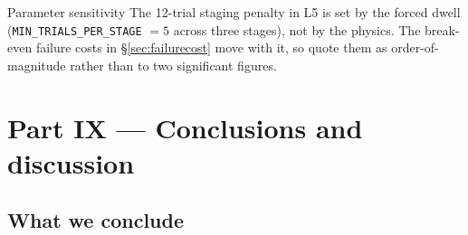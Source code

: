 \documentclass[11pt,a4paper]{article}
\begin{document}
\begin{warnbox}{Parameter sensitivity}
The 12-trial staging penalty in L5 is set by the forced dwell
(\texttt{MIN\_TRIALS\_PER\_STAGE} $=5$ across three stages), not by the
physics. The break-even failure costs in \S\ref{sec:failurecost} move with
it, so quote them as order-of-magnitude rather than to two significant
figures.
\end{warnbox}

\section{Part IX --- Conclusions and discussion}
\label{sec:conclusions}

\subsection{What we conclude}
\end{document}
